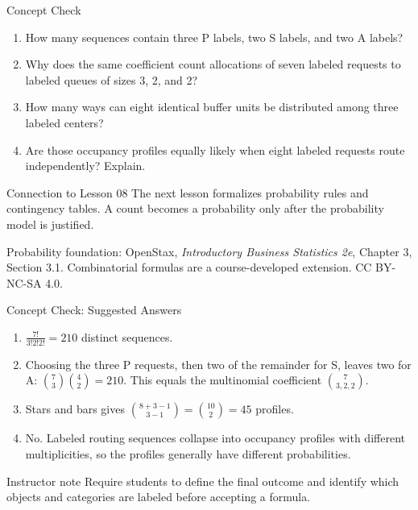 \documentclass[aspectratio=169,10pt,english]{beamer}
\begin{document}
\begin{frame}{Concept Check}
  \begin{enumerate}
    \item How many sequences contain three P labels, two S labels, and two A
      labels?
    \item Why does the same coefficient count allocations of seven labeled
      requests to labeled queues of sizes 3, 2, and 2?
    \item How many ways can eight identical buffer units be distributed among
      three labeled centers?
    \item Are those occupancy profiles equally likely when eight labeled
      requests route independently? Explain.
  \end{enumerate}

  \vspace{0.4em}
  \begin{block}{Connection to Lesson 08}
    The next lesson formalizes probability rules and contingency tables. A
    count becomes a probability only after the probability model is justified.
  \end{block}

  \vfill
  \scriptsize Probability foundation: OpenStax,
  \textit{Introductory Business Statistics 2e}, Chapter 3, Section 3.1.
  Combinatorial formulas are a course-developed extension. CC BY-NC-SA 4.0.
\end{frame}

\appendix

\begin{frame}{Concept Check: Suggested Answers}
  \begin{enumerate}
    \item $\frac{7!}{3!2!2!}=210$ distinct sequences.
    \item Choosing the three P requests, then two of the remainder for S,
      leaves two for A: $\binom{7}{3}\binom{4}{2}=210$. This equals the
      multinomial coefficient $\binom{7}{3,2,2}$.
    \item Stars and bars gives
      $\binom{8+3-1}{3-1}=\binom{10}{2}=45$ profiles.
    \item No. Labeled routing sequences collapse into occupancy profiles
      with different multiplicities, so the profiles generally have
      different probabilities.
  \end{enumerate}

  \begin{block}{Instructor note}
    Require students to define the final outcome and identify which objects
    and categories are labeled before accepting a formula.
  \end{block}
\end{frame}
\end{document}
